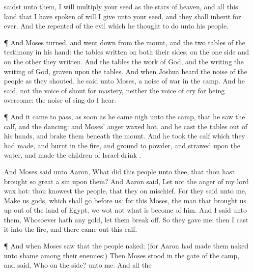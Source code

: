 {saidst unto them, I will
multiply your
seed as the
stars of
heaven, and all this
land that I have
spoken of will I
give unto your
seed, and they shall
inherit
{} for
ever.
And the
{}
repented of the
evil which he
thought to
do unto his
people.
\par }{\PP {}¶ And
Moses
turned, and went
down from the
mount, and the
two
tables of the
testimony
{} in his
hand: the
tables
{}
written on
both their
sides; on the one side and on the other
{} they
written.
And the
tables
{} the
work of
God, and the
writing
{} the
writing of
God,
graven upon the
tables.
And when
Joshua
heard the
noise of the
people as they
shouted, he
said unto
Moses,
{} a
noise of
war in the
camp.
And he
said,
{} not the
voice of
{}
shout for
mastery, neither
{} the
voice of
{}
cry for being
overcome:
{} the
noise of
{}
sing do I
hear.
\par }{\PP {}¶ And it came to pass, as soon as he came
nigh unto the
camp, that he
saw the
calf, and the
dancing: and
Moses’
anger waxed
hot, and he
cast the
tables out of his
hands, and
brake them
beneath the
mount.
And he
took the
calf which they had
made, and
burnt
{} in the
fire, and
ground
{} to
powder, and
strawed
{}
upon the
water, and made the
children of
Israel
drink
{}.
\par }{\PP {}And
Moses
said unto
Aaron, What
did this
people unto thee, that thou hast
brought so
great a
sin upon them?
And
Aaron
said, Let not the
anger of my
lord wax
hot: thou
knowest the
people, that they
{} on
mischief.
For they
said unto me,
Make us
gods, which shall
go
before us: for
{} this
Moses, the
man that brought us
up out of the
land of
Egypt, we
wot not what is become of him.
And I
said unto them, Whosoever hath any
gold, let them
break
{} off. So they
gave
{} me: then I
cast it into the
fire, and there came
out this
calf.
\par }{\PP {}¶ And when
Moses
saw that the
people
{}
naked; (for
Aaron had made them
naked unto
{}
shame among their
enemies:)
Then
Moses
stood in the
gate of the
camp, and
said, Who
{} on the
{} side?
{} unto me. And all the
}
